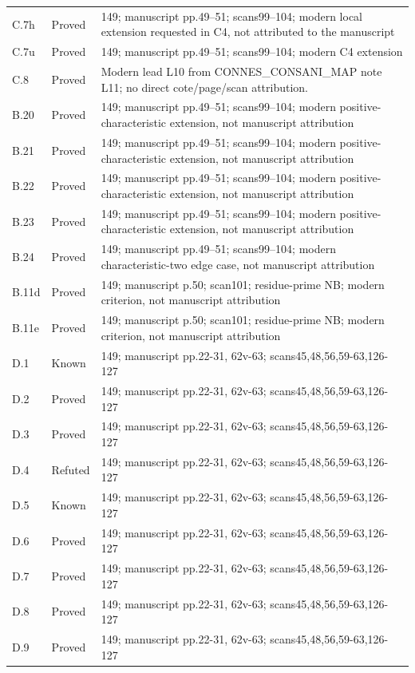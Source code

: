 {\begin{longtable}{p{1.9cm}p{1.7cm}p{10.3cm}}
C.7h & Proved & 149; manuscript pp.49–51; scans99–104; modern local extension requested in C4, not attributed to the manuscript \\
C.7u & Proved & 149; manuscript pp.49–51; scans99–104; modern C4 extension \\
C.8 & Proved & Modern lead L10 from CONNES\_CONSANI\_MAP note L11; no direct cote/page/scan attribution. \\
B.20 & Proved & 149; manuscript pp.49–51; scans99–104; modern positive-characteristic extension, not manuscript attribution \\
B.21 & Proved & 149; manuscript pp.49–51; scans99–104; modern positive-characteristic extension, not manuscript attribution \\
B.22 & Proved & 149; manuscript pp.49–51; scans99–104; modern positive-characteristic extension, not manuscript attribution \\
B.23 & Proved & 149; manuscript pp.49–51; scans99–104; modern positive-characteristic extension, not manuscript attribution \\
B.24 & Proved & 149; manuscript pp.49–51; scans99–104; modern characteristic-two edge case, not manuscript attribution \\
B.11d & Proved & 149; manuscript p.50; scan101; residue-prime NB; modern criterion, not manuscript attribution \\
B.11e & Proved & 149; manuscript p.50; scan101; residue-prime NB; modern criterion, not manuscript attribution \\
D.1 & Known & 149; manuscript pp.22-31, 62v-63; scans45,48,56,59-63,126-127 \\
D.2 & Proved & 149; manuscript pp.22-31, 62v-63; scans45,48,56,59-63,126-127 \\
D.3 & Proved & 149; manuscript pp.22-31, 62v-63; scans45,48,56,59-63,126-127 \\
D.4 & Refuted & 149; manuscript pp.22-31, 62v-63; scans45,48,56,59-63,126-127 \\
D.5 & Known & 149; manuscript pp.22-31, 62v-63; scans45,48,56,59-63,126-127 \\
D.6 & Proved & 149; manuscript pp.22-31, 62v-63; scans45,48,56,59-63,126-127 \\
D.7 & Proved & 149; manuscript pp.22-31, 62v-63; scans45,48,56,59-63,126-127 \\
D.8 & Proved & 149; manuscript pp.22-31, 62v-63; scans45,48,56,59-63,126-127 \\
D.9 & Proved & 149; manuscript pp.22-31, 62v-63; scans45,48,56,59-63,126-127 \\

\end{longtable}}
